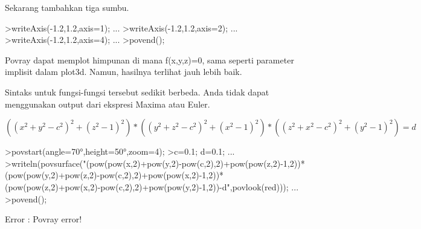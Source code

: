 \documentclass[a4paper,10pt]{article}
\begin{document}
\begin{eulernotebook}
\begin{eulercomment}
\begin{eulercomment}
\begin{eulercomment}
\begin{eulercomment}
\begin{eulercomment}
\begin{eulercomment}
\begin{eulercomment}
\begin{eulercomment}
\begin{eulercomment}
\begin{eulercomment}
\begin{eulercomment}
\begin{eulercomment}
\begin{eulercomment}
\begin{eulercomment}
\begin{eulercomment}
\begin{eulercomment}
\begin{eulercomment}
\begin{eulercomment}
\begin{eulercomment}
\begin{eulercomment}
\begin{eulercomment}
\begin{eulercomment}
\begin{eulercomment}
\begin{eulercomment}
\begin{eulercomment}
\begin{eulercomment}
\begin{eulercomment}
\begin{eulercomment}
\begin{eulercomment}
\begin{eulercomment}
\begin{eulercomment}
\begin{eulercomment}
\begin{eulercomment}
\begin{eulercomment}
\begin{eulercomment}
\begin{eulercomment}
\begin{eulercomment}
\begin{eulercomment}
\begin{eulercomment}
\begin{eulercomment}
\begin{eulercomment}
Sekarang tambahkan tiga sumbu.
\end{eulercomment}
\begin{eulerprompt}
>writeAxis(-1.2,1.2,axis=1); ...
>writeAxis(-1.2,1.2,axis=2); ...
>writeAxis(-1.2,1.2,axis=4); ...
>povend();
\end{eulerprompt}
\begin{eulercomment}
Povray dapat memplot himpunan di mana f(x,y,z)=0, sama seperti
parameter implisit dalam plot3d. Namun, hasilnya terlihat jauh lebih
baik.

Sintaks untuk fungsi-fungsi tersebut sedikit berbeda. Anda tidak dapat
menggunakan output dari ekspresi Maxima atau Euler.

\end{eulercomment}
\begin{eulerformula}
\[
((x^2+y^2-c^2)^2+(z^2-1)^2)*((y^2+z^2-c^2)^2+(x^2-1)^2)*((z^2+x^2-c^2)^2+(y^2-1)^2)=d
\]
\end{eulerformula}
\begin{eulerprompt}
>povstart(angle=70°,height=50°,zoom=4);
>c=0.1; d=0.1; ...
>writeln(povsurface("(pow(pow(x,2)+pow(y,2)-pow(c,2),2)+pow(pow(z,2)-1,2))*(pow(pow(y,2)+pow(z,2)-pow(c,2),2)+pow(pow(x,2)-1,2))*(pow(pow(z,2)+pow(x,2)-pow(c,2),2)+pow(pow(y,2)-1,2))-d",povlook(red))); ...
>povend();
\end{eulerprompt}
\begin{euleroutput}
  Error : Povray error!
  

\end{euleroutput}
\end{eulercomment}
\end{eulercomment}
\end{eulercomment}
\end{eulercomment}
\end{eulercomment}
\end{eulercomment}
\end{eulercomment}
\end{eulercomment}
\end{eulercomment}
\end{eulercomment}
\end{eulercomment}
\end{eulercomment}
\end{eulercomment}
\end{eulercomment}
\end{eulercomment}
\end{eulercomment}
\end{eulercomment}
\end{eulercomment}
\end{eulercomment}
\end{eulercomment}
\end{eulercomment}
\end{eulercomment}
\end{eulercomment}
\end{eulercomment}
\end{eulercomment}
\end{eulercomment}
\end{eulercomment}
\end{eulercomment}
\end{eulercomment}
\end{eulercomment}
\end{eulercomment}
\end{eulercomment}
\end{eulercomment}
\end{eulercomment}
\end{eulercomment}
\end{eulercomment}
\end{eulercomment}
\end{eulercomment}
\end{eulercomment}
\end{eulercomment}
\end{eulernotebook}
\end{document}
